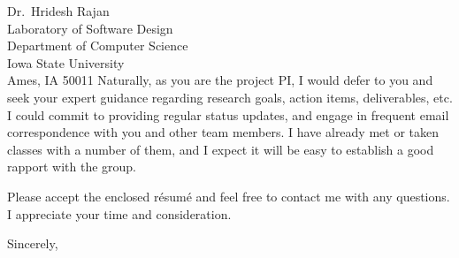 \documentclass{letter}
\begin{document}
\begin{letter}{%
    Dr.~Hridesh Rajan\\
    Laboratory of Software Design\\
    Department of Computer Science\\
    Iowa State University \\
    Ames, IA 50011}
Naturally, as you are the project PI, I would defer to you and seek your
expert guidance regarding research goals, action items, deliverables, etc.
I could commit to providing regular status updates, and engage in
frequent email correspondence with you and other team members.
I have already met or taken classes with a number of them, and I expect it
will be easy to establish a good rapport with the group.

Please accept the enclosed r\'{e}sum\'{e} and feel free to contact me with any
questions. I appreciate your time and consideration.

\closing{Sincerely,}

\end{letter}
\end{document}
